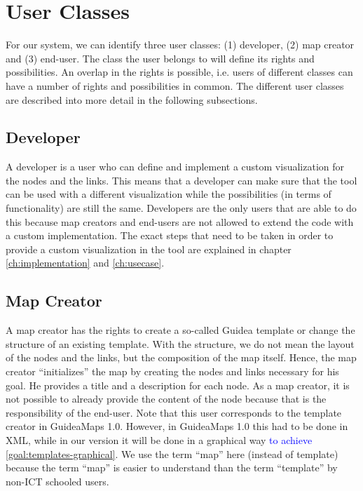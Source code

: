 \section{User Classes}\label{sec:user-classes}
For our system, we can identify three user classes: (1) developer, (2) map creator and (3) end-user. The class the user belongs to will define its rights and possibilities. An overlap in the rights is possible, i.e. users of different classes can have a number of rights and possibilities in common. The different user classes are described into more detail in the following subsections.

\subsection{Developer}\label{sec:user-class-developer}
A developer is a user who can define and implement a custom visualization for the nodes and the links. This means that a developer can make sure that the tool can be used with a different visualization while the possibilities (in terms of functionality) are still the same. Developers are the only users that are able to do this because map creators and end-users are not allowed to extend the code with a custom implementation. The exact steps that need to be taken in order to provide a custom visualization in the tool are explained in chapter \ref{ch:implementation} and \ref{ch:usecase}.

\subsection{Map Creator}\label{sec:user-class-map-creator}
A map creator has the rights to create a so-called Guidea template or change the structure of an existing template. With the structure, we do not mean the layout of the nodes and the links, but the composition of the map itself. Hence, the map creator ``initializes'' the map by creating the nodes and links necessary for his goal. He provides a title and a description for each node. As a map creator, it is not possible to already provide the content of the node because that is the responsibility of the end-user. Note that this user corresponds to the template creator in GuideaMaps 1.0. However, in GuideaMaps 1.0 this had to be done in XML, while in our version it will be done in a graphical way \textcolor{blue}{to achieve \ref{goal:templates-graphical}}. We use the term ``map'' here (instead of template) because the term ``map'' is easier to understand than the term ``template'' by non-ICT schooled users.

